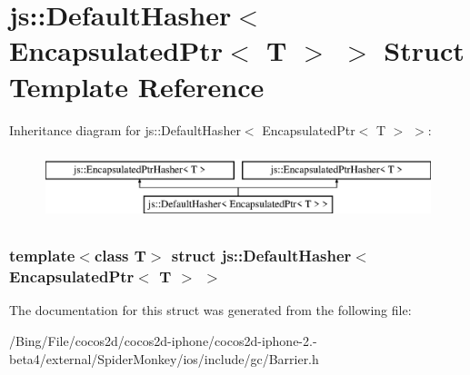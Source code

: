 \hypertarget{structjs_1_1_default_hasher_3_01_encapsulated_ptr_3_01_t_01_4_01_4}{\section{js\-:\-:Default\-Hasher$<$ Encapsulated\-Ptr$<$ T $>$ $>$ Struct Template Reference}
\label{structjs_1_1_default_hasher_3_01_encapsulated_ptr_3_01_t_01_4_01_4}
}
Inheritance diagram for js\-:\-:Default\-Hasher$<$ Encapsulated\-Ptr$<$ T $>$ $>$\-:\begin{figure}[H]
\begin{center}
\leavevmode
\includegraphics[height=2.000000cm]{structjs_1_1_default_hasher_3_01_encapsulated_ptr_3_01_t_01_4_01_4}
\end{center}
\end{figure}
\subsubsection*{template$<$class T$>$ struct js\-::\-Default\-Hasher$<$ Encapsulated\-Ptr$<$ T $>$ $>$}



The documentation for this struct was generated from the following file\-:\begin{DoxyCompactItemize}
\item 
/\-Bing/\-File/cocos2d/cocos2d-\/iphone/cocos2d-\/iphone-\/2.-\/beta4/external/\-Spider\-Monkey/ios/include/gc/Barrier.\-h\end{DoxyCompactItemize}

